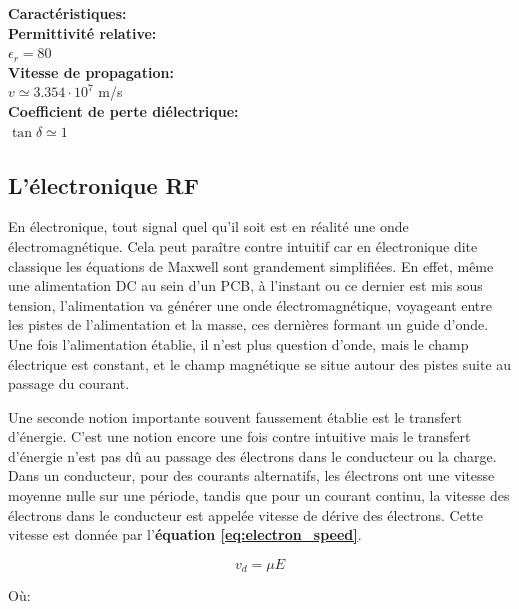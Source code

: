 \documentclass[12pt]{article}
\begin{document}
\newpage
\vspace{1cm}
 {\large\textbf{Caractéristiques:}}
\vspace{0.5cm} \\
\textbf{Permittivité relative:} \\
$\epsilon_r = 80$ 
\vspace{0.5cm}\\
\textbf{Vitesse de propagation:} \\
$v \simeq 3.354 \cdot 10^7$ m/s
\vspace{0.5cm}\\
\textbf{Coefficient de perte diélectrique:}\\
$\tan\delta \simeq 1$ 
\vspace{1cm}

\subsection{L’électronique RF}
En électronique, tout signal quel qu'il soit est en réalité une onde électromagnétique. Cela peut paraître contre intuitif car en électronique dite classique les équations de Maxwell sont grandement simplifiées. En effet, même une alimentation DC au sein d'un PCB, à l'instant ou ce dernier est mis sous tension, l'alimentation va générer une onde électromagnétique, voyageant entre les pistes de l'alimentation et la masse, ces dernières formant un guide d'onde. Une fois l'alimentation établie, il n'est plus question d'onde, mais le champ électrique est constant, et le champ magnétique se situe autour des pistes suite au passage du courant. 

\vspace{0.5cm}
Une seconde notion importante souvent faussement établie est le transfert d’énergie. C'est une notion encore une fois contre intuitive mais le transfert d'énergie n'est pas dû au passage des électrons dans le conducteur ou la charge. Dans un conducteur, pour des courants alternatifs, les électrons ont une vitesse moyenne nulle sur une période, tandis que pour un courant continu, la vitesse des électrons dans le conducteur est appelée vitesse de dérive des électrons. Cette vitesse est donnée par l'\textbf{équation \ref{eq:electron_speed}}.

\vspace{0.5cm}
{\large
\begin{equation}
v_d = \mu E 
\label{eq:electron_speed}
\end{equation}}

Où:
\end{document}
